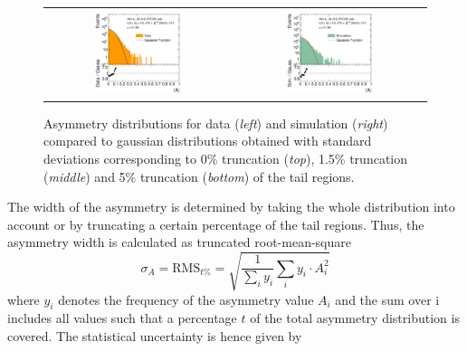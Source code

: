 \begin{figure}[!htp]
\begin{tabular}{cc}
                \includegraphics[width=0.49\textwidth]{figures/AsymmHistosDataWithRatio_Eta0_pt5_alpha2_final_nominal_95Truncation_v4.pdf} &
                \includegraphics[width=0.49\textwidth]{figures/AsymmHistosSimWithRatio_Eta0_pt5_alpha2_final_nominal_95Truncation_v4.pdf} \\
  \end{tabular}
  \caption{Asymmetry distributions for data (\textit{left}) and simulation (\textit{right}) compared to gaussian distributions obtained with standard deviations corresponding to 0\% truncation (\textit{top}), 1.5\% truncation (\textit{middle}) and 5\% truncation (\textit{bottom}) of the tail regions.}
  \label{fig:asymm_width}
\end{figure}
The width of the asymmetry is determined by taking the whole distribution into account or by truncating a certain percentage of the tail regions. Thus, the asymmetry width is calculated as truncated root-mean-square
\begin{equation}
 \sigma_A = \mathrm{RMS}_{t\%} = \sqrt{\frac{1}{\sum_{i} y_i} \sum_{i} y_i \cdot A_i^2}  
\end{equation} 
where $y_i$ denotes the frequency of the asymmetry value $A_i$ and the sum over i includes all values such that a percentage $t$ of the total asymmetry distribution is covered. The statistical uncertainty is hence given by

